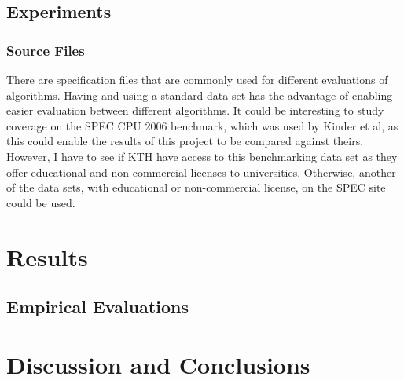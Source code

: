 \documentclass{kththesis}
\begin{document}


\section{Experiments}

\subsection{Source Files}
There are specification files that are commonly used for different evaluations of algorithms. Having and using a standard data set has the advantage of enabling easier evaluation between different algorithms. It could be interesting to study coverage on the SPEC CPU 2006 benchmark, which was used by Kinder et al\cite{alternating}, as this could enable the results of this project to be compared against theirs\cite{alternating}. However, I have to see if KTH have access to this benchmarking data set as they offer educational and non-commercial licenses to universities\cite{SPECData}. Otherwise, another of the data sets, with educational or non-commercial license, on the SPEC site could be used\cite{SPECData}.

\chapter{Results}\label{chap:results}

\section{Empirical Evaluations}

\chapter{Discussion and Conclusions}\label{chap:discussionAndConclusions}
\end{document}
